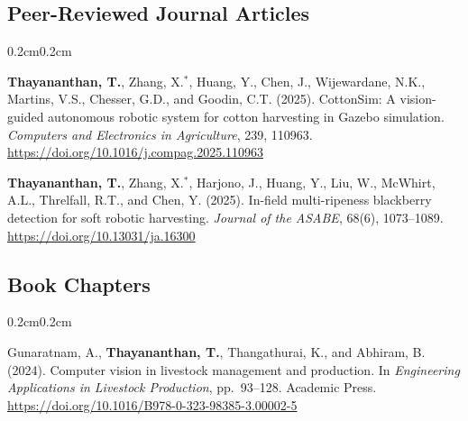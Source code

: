 \documentclass[10pt, letterpaper]{article}
\newcommand{\textbfr}[1]{\textbf{#1}}
\newenvironment{onecolentry}{%
    \begin{adjustwidth}{0.2cm}{0.2cm}
}{\end{adjustwidth}}
\newenvironment{pubsJ}{%
  \begin{enumerate}[label={[J\arabic*]}, leftmargin=1.15cm, labelsep=0.2cm,
                    topsep=0.08cm, parsep=0.08cm, partopsep=0pt, itemsep=0pt]
}{\end{enumerate}}
\newenvironment{pubsB}{%
  \begin{enumerate}[label={[B\arabic*]}, leftmargin=1.15cm, labelsep=0.2cm,
                    topsep=0.08cm, parsep=0.08cm, partopsep=0pt, itemsep=0pt]
}{\end{enumerate}}
\begin{document}
\subsection{Peer-Reviewed Journal Articles}
\begin{onecolentry}
\begin{pubsJ}
    \item \textbfr{Thayananthan, T.}, Zhang, X.$^{*}$, Huang, Y., Chen, J.,
    Wijewardane, N.K., Martins, V.S., Chesser, G.D., and Goodin, C.T. (2025).
    CottonSim: A vision-guided autonomous robotic system for cotton harvesting in
    Gazebo simulation. \emph{Computers and Electronics in Agriculture}, 239, 110963.
    \url{https://doi.org/10.1016/j.compag.2025.110963}

    \item \textbfr{Thayananthan, T.}, Zhang, X.$^{*}$, Harjono, J., Huang, Y., Liu, W.,
    McWhirt, A.L., Threlfall, R.T., and Chen, Y. (2025). In-field multi-ripeness
    blackberry detection for soft robotic harvesting. \emph{Journal of the ASABE},
    68(6), 1073--1089. \url{https://doi.org/10.13031/ja.16300}
\end{pubsJ}
\end{onecolentry}
\vspace{0.12cm}

\subsection{Book Chapters}
\begin{onecolentry}
\begin{pubsB}
    \item Gunaratnam, A., \textbfr{Thayananthan, T.}, Thangathurai, K., and
    Abhiram, B. (2024). Computer vision in livestock management and production.
    In \emph{Engineering Applications in Livestock Production}, pp.~93--128.
    Academic Press. \url{https://doi.org/10.1016/B978-0-323-98385-3.00002-5}
\end{pubsB}
\end{onecolentry}
\vspace{0.12cm}
\end{document}
